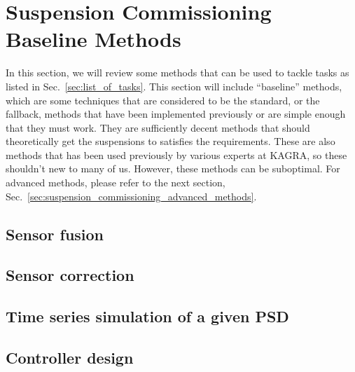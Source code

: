 \section{Suspension Commissioning Baseline Methods \label{sec:suspension_commissioning_baseline_methods}}
In this section, we will review some methods that can be used to tackle tasks as listed in Sec.~\ref{sec:list_of_tasks}.
This section will include ``baseline'' methods, which are some techniques that are considered to be the standard, or the fallback, methods that have been implemented previously or are simple enough that they must work.
They are sufficiently decent methods that should theoretically get the suspensions to satisfies the requirements.
These are also methods that has been used previously by various experts at KAGRA, so these shouldn't new to many of us.
However, these methods can be suboptimal.
For advanced methods, please refer to the next section, Sec.~\ref{sec:suspension_commissioning_advanced_methods}.






\subsection{Sensor fusion}
\subsection{Sensor correction \label{sec:sensor_correction}}
\subsection{Time series simulation of a given PSD}
\subsection{Controller design}

